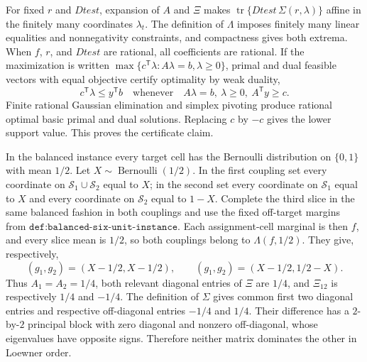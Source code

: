 For fixed \(r\) and \(Dtest\), expansion of \(A\) and \(\Xi\) makes \(\operatorname{tr}\{Dtest\,\Sigma(r,\lambda)\}\) affine in the finitely many coordinates \(\lambda_t\). The definition of \(\Lambda\) imposes finitely many linear equalities and nonnegativity constraints, and compactness gives both extrema. When \(f\), \(r\), and \(Dtest\) are rational, all coefficients are rational. If the maximization is written \(\max\{c^{\mathsf T}\lambda:A\lambda=b,\lambda\ge0\}\), primal and dual feasible vectors with equal objective certify optimality by weak duality,
\[
c^{\mathsf T}\lambda\le y^{\mathsf T}b\quad\text{whenever}\quad A\lambda=b,\ \lambda\ge0,\ A^{\mathsf T}y\ge c.
\]
Finite rational Gaussian elimination and simplex pivoting produce rational optimal basic primal and dual solutions. Replacing \(c\) by \(-c\) gives the lower support value. This proves the certificate claim.

In the balanced instance every target cell has the Bernoulli distribution on \(\{0,1\}\) with mean \(1/2\). Let \(X\sim\operatorname{Bernoulli}(1/2)\). In the first coupling set every coordinate on \(\mathcal S_1\cup\mathcal S_2\) equal to \(X\); in the second set every coordinate on \(\mathcal S_1\) equal to \(X\) and every coordinate on \(\mathcal S_2\) equal to \(1-X\). Complete the third slice in the same balanced fashion in both couplings and use the fixed off-target margins from \(\texttt{def:balanced-six-unit-instance}\). Each assignment-cell marginal is then \(f\), and every slice mean is \(1/2\), so both couplings belong to \(\Lambda(f,1/2)\). They give, respectively,
\[
(g_1,g_2)=(X-1/2,X-1/2),\qquad
(g_1,g_2)=(X-1/2,1/2-X).
\]
Thus \(A_1=A_2=1/4\), both relevant diagonal entries of \(\Xi\) are \(1/4\), and \(\Xi_{12}\) is respectively \(1/4\) and \(-1/4\). The definition of \(\Sigma\) gives common first two diagonal entries and respective off-diagonal entries \(-1/4\) and \(1/4\). Their difference has a \(2\)-by-\(2\) principal block with zero diagonal and nonzero off-diagonal, whose eigenvalues have opposite signs. Therefore neither matrix dominates the other in Loewner order.


